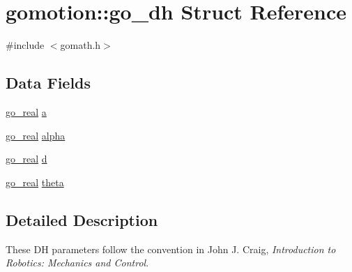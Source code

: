 \hypertarget{structgomotion_1_1go__dh}{\section{gomotion\-:\-:go\-\_\-dh Struct Reference}
\label{structgomotion_1_1go__dh}
}


{\ttfamily \#include $<$gomath.\-h$>$}

\subsection*{Data Fields}
\begin{DoxyCompactItemize}
\item 
\hyperlink{gotypes_8h_afd666a2393eebd71ee455846ac9def9b}{go\-\_\-real} \hyperlink{structgomotion_1_1go__dh_a7c0eb988be1174d9e399e1d879289cde}{a}
\item 
\hyperlink{gotypes_8h_afd666a2393eebd71ee455846ac9def9b}{go\-\_\-real} \hyperlink{structgomotion_1_1go__dh_a46264c283e1edf0b1195abf35f537e5c}{alpha}
\item 
\hyperlink{gotypes_8h_afd666a2393eebd71ee455846ac9def9b}{go\-\_\-real} \hyperlink{structgomotion_1_1go__dh_a7ab3aa958eb98cc5e3b2b0953d7d567f}{d}
\item 
\hyperlink{gotypes_8h_afd666a2393eebd71ee455846ac9def9b}{go\-\_\-real} \hyperlink{structgomotion_1_1go__dh_a36e042da533df4bc583d8d8e26997111}{theta}
\end{DoxyCompactItemize}


\subsection{Detailed Description}
These D\-H parameters follow the convention in John J. Craig, {\itshape Introduction to Robotics\-: Mechanics and Control}. 

